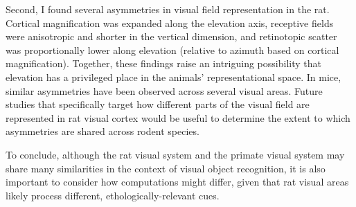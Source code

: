Second, I found several asymmetries in visual field representation in the rat. Cortical magnification was expanded along the elevation axis, receptive fields were anisotropic and shorter in the vertical dimension, and retinotopic scatter was proportionally lower along elevation (relative to azimuth based on cortical magnification). Together, these findings raise an intriguing possibility that elevation has a privileged place in the animals' representational space. In mice, similar asymmetries have been observed across several visual areas\cite{Bonin2011, Juavinett2017, Liang2018, Sit2020}. Future studies that specifically target how different parts of the visual field are represented in rat visual cortex would be useful to determine the extent to which asymmetries are shared across rodent species.

To conclude, although the rat visual system and the primate visual system may share many similarities in the context of visual object recognition, it is also important to consider how computations might differ, given that rat visual areas likely process different, ethologically-relevant cues. 



